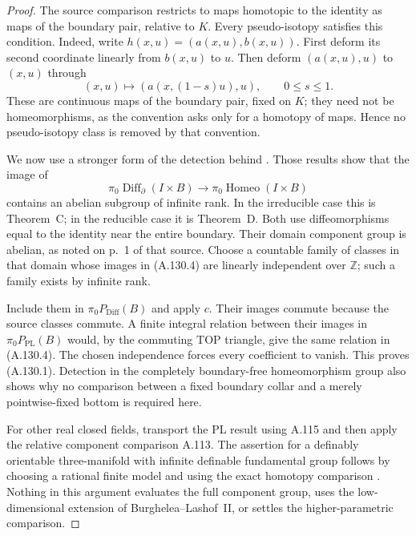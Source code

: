 \begin{proof}
The source comparison restricts to maps homotopic to the identity
as maps of the boundary pair, relative to $K$. Every pseudo-isotopy
satisfies this condition. Indeed, write
$h(x,u)=(a(x,u),b(x,u))$. First deform its second coordinate
linearly from $b(x,u)$ to $u$. Then deform
$(a(x,u),u)$ to $(x,u)$ through
\[
 (x,u)\longmapsto(a(x,(1-s)u),u),\qquad 0\le s\le1.
\]
These are continuous maps of the boundary pair, fixed on $K$;
they need not be homeomorphisms, as the convention asks only for
a homotopy of maps. Hence no pseudo-isotopy class is removed by
that convention.

We now use a stronger form of the detection behind
\cite[Theorem~B, p.~2; Theorem~C, p.~13 and its deduction on p.~14;
Theorem~D, p.~28]{LinXieZhang2026}.
Those results show that the image of
\[
 \pi_0\operatorname{Diff}_{\partial}(I\times B)
 \longrightarrow \pi_0\operatorname{Homeo}(I\times B)
                                                        \tag{A.130.4}
\]
contains an abelian subgroup of infinite rank. In the irreducible
case this is Theorem~C; in the reducible case it is Theorem~D.
Both use diffeomorphisms equal to the identity near the entire
boundary. Their domain component group is abelian, as noted
on p.~1 of that source. Choose a countable family of classes
in that domain whose images in (A.130.4) are linearly independent
over $\mathbb Z$; such a family exists by infinite rank.

Include them in $\pi_0P_{\mathrm{Diff}}(B)$ and apply $c$.
Their images commute because the source classes commute.
A finite integral relation between their images in
$\pi_0P_{\mathrm{PL}}(B)$ would, by the commuting TOP triangle,
give the same relation in (A.130.4). The chosen independence
forces every coefficient to vanish. This proves (A.130.1).
Detection in the completely boundary-free homeomorphism group
also shows why no comparison between a fixed boundary collar
and a merely pointwise-fixed bottom is required here.

For other real closed fields, transport the PL result using
A.115 and then apply the relative component comparison A.113.
The assertion for a definably orientable three-manifold with
infinite definable fundamental group follows by choosing a
rational finite model and using the exact homotopy comparison
\cite[arXiv version~1, Corollary~4.3, p.~10]{BaroOtero2008v1}.
Nothing in this argument evaluates the full component group,
uses the low-dimensional extension of Burghelea--Lashof~II,
or settles the higher-parametric comparison.
\end{proof}
